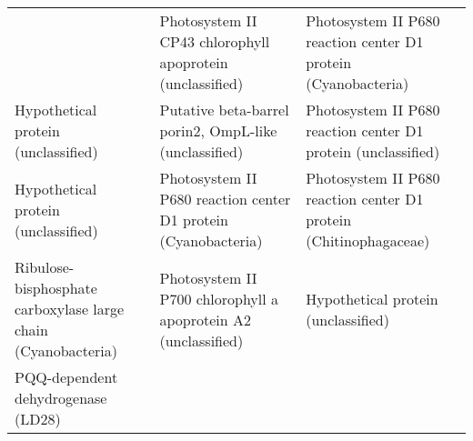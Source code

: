 \documentclass[]{article}
\begin{document}
\begin{longtable}[]{@{}lll@{}}
\begin{minipage}[t]{0.24\columnwidth}
\end{minipage} & \begin{minipage}[t]{0.33\columnwidth}\raggedright\strut
Photosystem II CP43 chlorophyll apoprotein (unclassified)\strut
\end{minipage} & \begin{minipage}[t]{0.33\columnwidth}\raggedright\strut
Photosystem II P680 reaction center D1 protein (Cyanobacteria)\strut
\end{minipage}\tabularnewline
\begin{minipage}[t]{0.24\columnwidth}\raggedright\strut
Hypothetical protein (unclassified)\strut
\end{minipage} & \begin{minipage}[t]{0.33\columnwidth}\raggedright\strut
Putative beta-barrel porin2, OmpL-like (unclassified)\strut
\end{minipage} & \begin{minipage}[t]{0.33\columnwidth}\raggedright\strut
Photosystem II P680 reaction center D1 protein (unclassified)\strut
\end{minipage}\tabularnewline
\begin{minipage}[t]{0.24\columnwidth}\raggedright\strut
Hypothetical protein (unclassified)\strut
\end{minipage} & \begin{minipage}[t]{0.33\columnwidth}\raggedright\strut
Photosystem II P680 reaction center D1 protein (Cyanobacteria)\strut
\end{minipage} & \begin{minipage}[t]{0.33\columnwidth}\raggedright\strut
Photosystem II P680 reaction center D1 protein (Chitinophagaceae)\strut
\end{minipage}\tabularnewline
\begin{minipage}[t]{0.24\columnwidth}\raggedright\strut
Ribulose-bisphosphate carboxylase large chain (Cyanobacteria)\strut
\end{minipage} & \begin{minipage}[t]{0.33\columnwidth}\raggedright\strut
Photosystem II P700 chlorophyll a apoprotein A2 (unclassified)\strut
\end{minipage} & \begin{minipage}[t]{0.33\columnwidth}\raggedright\strut
Hypothetical protein (unclassified)\strut
\end{minipage}\tabularnewline
\begin{minipage}[t]{0.24\columnwidth}\raggedright\strut
PQQ-dependent dehydrogenase (LD28)\strut
\end{minipage} & \begin{minipage}[t]{0.33\columnwidth}\raggedright\strut

\end{minipage}
\end{longtable}
\end{document}
